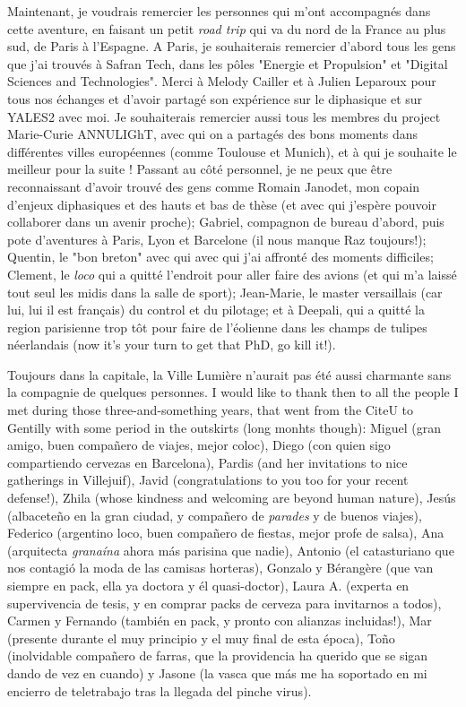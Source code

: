 Maintenant, je voudrais remercier les personnes qui m'ont accompagnés dans cette aventure, en faisant un petit \textsl{road trip} qui va du nord de la France au plus sud, de Paris à l'Espagne. A Paris, je souhaiterais remercier d'abord tous les gens que j'ai trouvés à Safran Tech, dans les pôles "Energie et Propulsion" et "Digital Sciences and Technologies". Merci à Melody Cailler et à Julien Leparoux pour tous nos échanges et d'avoir partagé son expérience sur le diphasique et sur YALES2 avec moi. Je souhaiterais remercier aussi tous les membres du project Marie-Curie ANNULIGhT, avec qui on a partagés des bons moments dans différentes villes européennes (comme Toulouse et Munich), et à qui je souhaite le meilleur pour la suite ! Passant au côté personnel, je ne peux que être reconnaissant d'avoir trouvé des gens comme Romain Janodet, mon copain d'enjeux diphasiques et des hauts et bas de thèse (et avec qui j'espère pouvoir collaborer dans un avenir proche); Gabriel, compagnon de bureau d'abord, puis pote d'aventures à Paris, Lyon et Barcelone (il nous manque Raz toujours!); Quentin, le "bon breton" avec qui avec qui j'ai affronté des moments difficiles; Clement, le \textsl{loco} qui a quitté l'endroit pour aller faire des avions (et qui m'a laissé tout seul les midis dans la salle de sport); Jean-Marie, le master versaillais (car lui, lui il est français) du control et du pilotage; et à Deepali, qui a quitté la region parisienne trop tôt pour faire de l'éolienne dans les champs de tulipes néerlandais (now it's your turn to get that PhD, go kill it!).
  
Toujours dans la capitale, la Ville Lumière n'aurait pas été aussi charmante sans la compagnie de quelques personnes. I would like to thank then to all the people I met during those three-and-something years, that went from the CiteU to Gentilly with some period in the outskirts (long monhts though): Miguel (gran amigo, buen compañero de viajes, mejor coloc), Diego (con quien sigo compartiendo cervezas en Barcelona), Pardis (and her invitations to nice gatherings in Villejuif), Javid (congratulations to you too for your recent defense!), Zhila (whose kindness and welcoming are beyond human nature), Jesús (albaceteño en la gran ciudad, y compañero de \textsl{parades} y de buenos viajes), Federico (argentino loco, buen compañero de fiestas, mejor profe de salsa), Ana (arquitecta \textsl{granaína} ahora más parisina que nadie), Antonio (el catasturiano que nos contagió la moda de las camisas horteras), Gonzalo y Bérangère (que van siempre en pack, ella ya doctora y él quasi-doctor), Laura A. (experta en supervivencia de tesis, y en comprar packs de cerveza para invitarnos a todos), Carmen y Fernando (también en pack, y pronto con alianzas incluidas!), Mar (presente durante el muy principio y el muy final de esta época), Toño (inolvidable compañero de farras, que la providencia ha querido que se sigan dando de vez en cuando) y Jasone (la vasca que más me ha soportado en mi encierro de teletrabajo tras la llegada del pinche virus).

